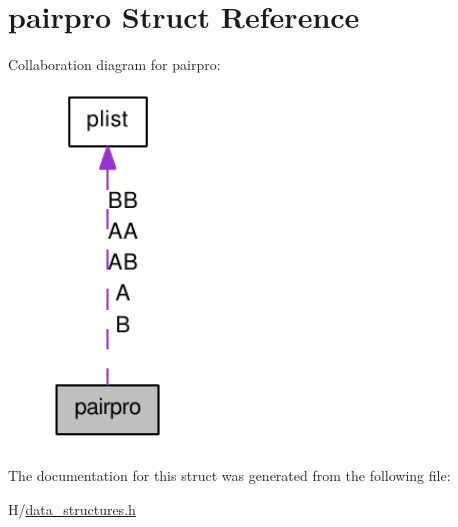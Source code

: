 \hypertarget{structpairpro}{
\section{pairpro Struct Reference}
\label{structpairpro}
}


Collaboration diagram for pairpro:\nopagebreak
\begin{figure}[H]
\begin{center}
\leavevmode
\includegraphics[width=90pt]{structpairpro__coll__graph}
\end{center}
\end{figure}


The documentation for this struct was generated from the following file:\begin{DoxyCompactItemize}
\item 
H/\hyperlink{data__structures_8h}{data\_\-structures.h}\end{DoxyCompactItemize}
